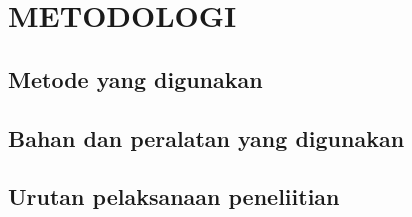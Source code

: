 \chapter{METODOLOGI}

\section{Metode yang digunakan}

\section{Bahan dan peralatan yang digunakan}

\section{Urutan pelaksanaan peneliitian}

